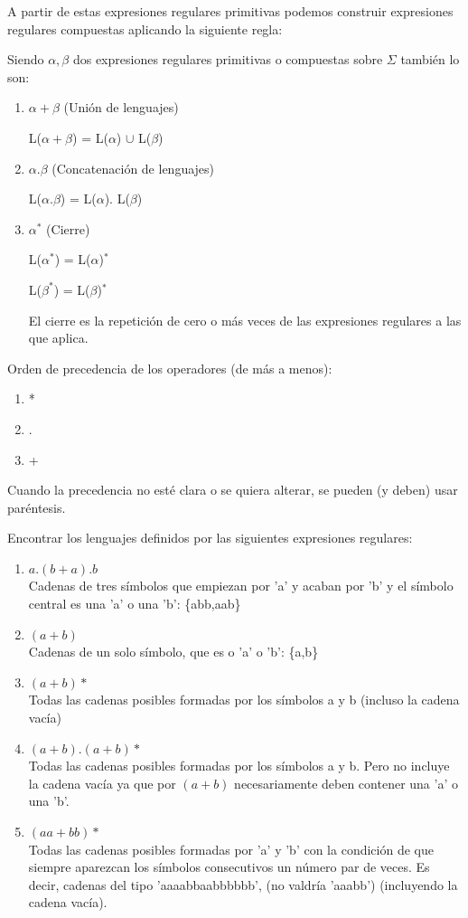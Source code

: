 \documentclass{apuntes}
\begin{document}
A partir de estas expresiones regulares primitivas podemos construir expresiones regulares compuestas aplicando la siguiente regla:

Siendo $\alpha, \beta$ dos expresiones regulares primitivas o compuestas sobre $\Sigma$ también lo son:
\begin{enumerate}
\item $\alpha + \beta$ (Unión de lenguajes)

L($\alpha + \beta$) = L($\alpha $) $\cup$ L($\beta$)
\item $\alpha . \beta$ (Concatenación de lenguajes)

L($\alpha . \beta$) = L($\alpha $). L($\beta$)
\item $\alpha^*$ (Cierre)

L($\alpha^*$) = L($\alpha$)$^*$

L($\beta^*$) = L($\beta$)$^*$

El cierre es la repetición de cero o más veces de las expresiones regulares a las que aplica.
\end{enumerate}

Orden de precedencia de los operadores (de más a menos):
\begin{enumerate}
\item *
\item .
\item +
\end{enumerate}
Cuando la precedencia no esté clara o se quiera alterar, se pueden (y deben) usar paréntesis.

\begin{example}
Encontrar los lenguajes definidos por las siguientes expresiones regulares:
\begin{enumerate}
\item$a.(b+a).b$\\
 Cadenas de tres símbolos que empiezan por 'a' y acaban por 'b' y el símbolo central es una 'a' o una 'b': \{abb,aab\}
\item $(a+b)$\\
Cadenas de un solo símbolo, que es o 'a' o 'b': \{a,b\}
\item $(a+b)*$\\
Todas las cadenas posibles formadas por los símbolos a y b (incluso la cadena vacía)
\item $(a+b).(a+b)*$ \\
Todas las cadenas posibles formadas por los símbolos a y b. Pero no incluye la cadena vacía ya que por $(a+b)$ necesariamente deben contener una 'a' o una 'b'.
\item $(aa+bb)*$ \\
Todas las cadenas posibles formadas por 'a' y 'b' con la condición de que siempre aparezcan los símbolos consecutivos un número par de veces. Es decir, cadenas del tipo 'aaaabbaabbbbbb', (no valdría 'aaabb') (incluyendo la cadena vacía).

\end{enumerate}

\end{example}
\end{document}
